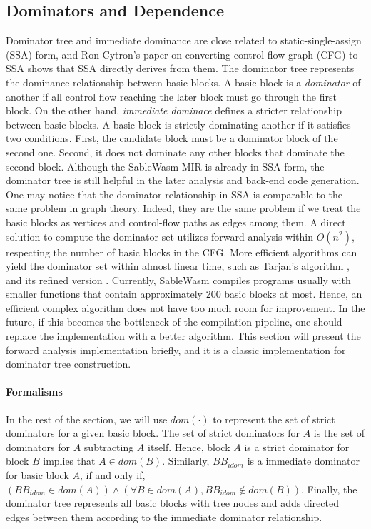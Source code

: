 \subsection{Dominators and Dependence}

Dominator tree and immediate dominance are close related to static-single-assign (SSA) form, and Ron Cytron's paper on converting control-flow graph (CFG) to SSA \cite{ibm-ssa} shows that SSA directly derives from them. The dominator tree represents the dominance relationship between basic blocks. A basic block is a \emph{dominator} of another if all control flow reaching the later block must go through the first block. On the other hand, \emph{immediate dominace} defines a stricter relationship between basic blocks. A basic block is strictly dominating another if it satisfies two conditions. First, the candidate block must be a dominator block of the second one. Second, it does not dominate any other blocks that dominate the second block. Although the SableWasm MIR is already in SSA form, the dominator tree is still helpful in the later analysis and back-end code generation. One may notice that the dominator relationship in SSA is comparable to the same problem in graph theory. Indeed, they are the same problem if we treat the basic blocks as vertices and control-flow paths as edges among them.  A direct solution to compute the dominator set utilizes forward analysis within $O(n^2)$, respecting the number of basic blocks in the CFG. More efficient algorithms can yield the dominator set within almost linear time, such as Tarjan's algorithm \cite{tarjan-fast-dominator}, and its refined version \cite{tarjan-fast-dominator-improved}. Currently, SableWasm compiles programs usually with smaller functions that contain approximately 200 basic blocks at most. Hence, an efficient complex algorithm does not have too much room for improvement. In the future, if this becomes the bottleneck of the compilation pipeline, one should replace the implementation with a better algorithm. This section will present the forward analysis implementation briefly, and it is a classic implementation for dominator tree construction.

\paragraph{Formalisms}
In the rest of the section, we will use $dom(\cdot)$ to represent the set of strict dominators for a given basic block. The set of strict dominators for $A$ is the set of dominators for $A$ subtracting $A$ itself. Hence, block $A$ is a strict dominator for block $B$ implies that $A \in dom(B)$. Similarly, $BB_{idom}$ is a immediate dominator for basic block $A$, if and only if, $(BB_{idom} \in dom(A)) \land (\forall B \in dom(A), BB_{idom} \notin dom(B))$. Finally, the dominator tree represents all basic blocks with tree nodes and adds directed edges between them according to the immediate dominator relationship.

